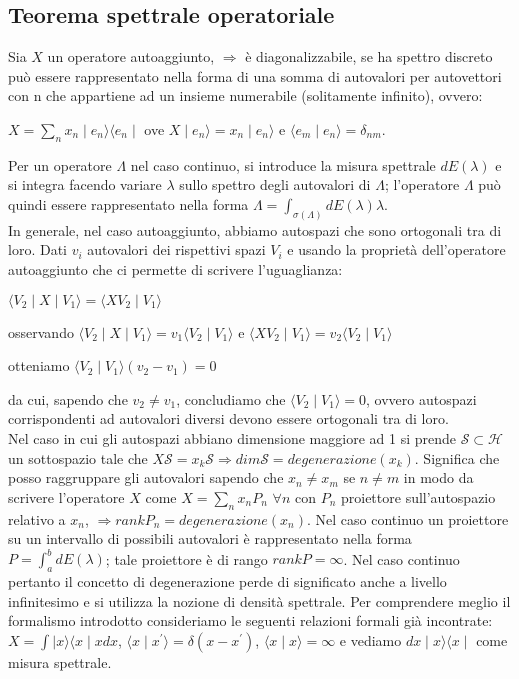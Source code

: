 \subsection{Teorema spettrale operatoriale} %
Sia $X$ un operatore autoaggiunto, $\Rightarrow$ è diagonalizzabile, se ha spettro discreto può essere rappresentato nella forma di una somma di autovalori per autovettori con n che appartiene ad un insieme numerabile (solitamente infinito), ovvero:
\begin{center} $X=\sum_{n} x_{n} \mid e_{n} \rangle \langle e_{n} \mid$ ove $X \mid e_{n} \rangle = x_{n} \mid e_{n} \rangle$ e $\langle e_{m} \mid e_{n} \rangle=\delta_{nm}$. \end{center}
Per un operatore $\Lambda$ nel caso continuo, si introduce la misura spettrale $dE(\lambda)$ e si integra facendo variare $\lambda$ sullo spettro degli autovalori di $\Lambda$; l'operatore $\Lambda$ può quindi essere rappresentato nella forma $\Lambda = \int_{\sigma(\Lambda)} dE(\lambda) \lambda$.\\
In generale, nel caso autoaggiunto, abbiamo autospazi che sono ortogonali tra di loro. Dati $v_{i}$ autovalori dei rispettivi spazi $V_{i}$ e usando la proprietà dell'operatore autoaggiunto che ci permette di scrivere l'uguaglianza:
\begin{center} $\langle V_{2} \mid X \mid V_{1} \rangle = \langle X V_{2} \mid V_{1} \rangle$ \end{center}
\begin{center} osservando $\langle V_{2} \mid X \mid V_{1} \rangle = v_{1} \langle V_{2} \mid V_{1} \rangle$ e $\langle X V_{2} \mid V_{1} \rangle = v_{2} \langle V_{2} \mid V_{1} \rangle$ \end{center}
\begin{center} otteniamo $\langle V_{2} \mid V_{1} \rangle (v_{2} - v_{1})=0$ \end{center}
da cui, sapendo che $v_{2} \ne v_{1} $, concludiamo che $\langle V_{2} \mid V_{1} \rangle =0$, ovvero autospazi corrispondenti ad autovalori diversi devono essere ortogonali tra di loro.\\
Nel caso in cui gli autospazi abbiano dimensione maggiore ad 1 si prende $\mathcal{S} \subset \mathcal{H}$ un sottospazio tale che $X\mathcal{S}=x_{k}\mathcal{S} \Rightarrow dim\mathcal{S} = degenerazione(x_{k})$. Significa che posso raggruppare gli autovalori sapendo che $x_{n}\neq x_{m}$ se $n\neq m$ in modo da scrivere l'operatore $X$ come $X=\sum_{n} x_{n}P_{n}$ $\forall n$ con $P_{n}$ proiettore sull'autospazio relativo a $x_{n}$, $\Rightarrow rankP_{n}=degenerazione(x_{n})$. Nel caso continuo un proiettore su un intervallo di possibili autovalori è rappresentato nella forma $P= \int_{a}^{b} dE(\lambda)$; tale proiettore è di rango $rankP=\infty$. Nel caso continuo pertanto il concetto di degenerazione perde di significato anche a livello infinitesimo e si utilizza la nozione di densità spettrale. Per comprendere meglio il formalismo introdotto consideriamo le seguenti relazioni formali già incontrate: $X=\int \mid x \rangle \langle x \mid x dx$, $\langle x \mid x^{'} \rangle = \delta(x-x^{'})$, $\langle x \mid x \rangle = \infty$ e vediamo $dx \mid x \rangle \langle x \mid$ come misura spettrale.\\
